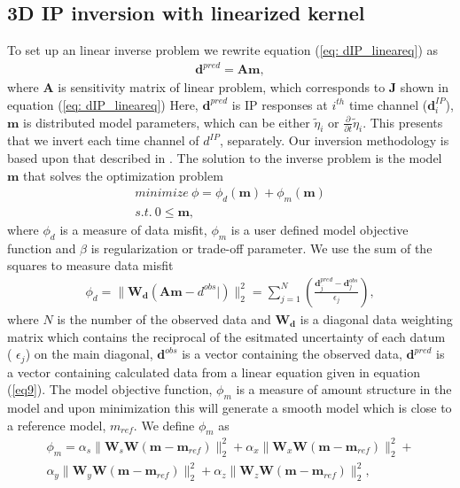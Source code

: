 \documentclass[a4paper, 11pt]{article}
\newcommand{\peta}{\tilde{\eta}}
\begin{document}
\subsection{3D IP inversion with linearized kernel}
To set up an linear inverse problem we rewrite equation (\ref{eq: dIP_lineareq}) as
\begin{eqnarray}
  \mathbf{d}^{pred} = \mathbf{A}\mathbf{m},
  \label{eq9}
\end{eqnarray}
where $\mathbf{A}$ is sensitivity matrix of linear problem, which corresponds to $\mathbf{J}$ shown in equation (\ref{eq: dIP_lineareq}) 
Here, $\mathbf{d}^{pred}$ is IP responses at $i^{th}$ time channel ($\mathbf{d}^{IP}_i$), $\mathbf{m}$ is distributed model parameters, which can be either $\peta_{i}$ or $\frac{\partial}{\partial t}\peta_{i}$. 
This presents that we invert each time channel of $d^{IP}$, separately. 
Our inversion methodology is based upon that described in \cite{doug1994}. The solution to the inverse problem is the model $\mathbf{m}$ that solves the optimization problem
\begin{eqnarray}
  minimize \ \phi =  \phi_d(\mathbf{m}) + \phi_m(\mathbf{m})\nonumber \\
  s.t. \ 0 \le \mathbf{m},
  \label{eq10}
\end{eqnarray}
where $\phi_d$ is a measure of data misfit, $\phi_m$ is a user defined model objective function and $\beta$ is regularization or trade-off parameter. 
We use the sum of the squares to measure data misfit
\begin{eqnarray}
  \phi_d = \| \mathbf{W_d}(\mathbf{A}\mathbf{m}-d^{obs}|)\|^2_2 =
  \sum^N_{j=1}(\frac{\mathbf{d}^{pred}_j-\mathbf{d}^{obs}_j}{\epsilon_j}),
  \label{eq11}
\end{eqnarray}
where $N$ is the number of the observed data and $\mathbf{W_d}$ is a diagonal data weighting matrix which contains the reciprocal of the esitmated uncertainty of each datum (
$\epsilon_j$) on the main diagonal,  $\mathbf{d}^{obs}$ is a vector containing the observed data, $\mathbf{d}^{pred}$ is a vector containing calculated data from a linear equation given in equation (\ref{eq9}).
The model objective function, $\phi_m$ is a measure of amount structure in the model and upon minimization this will generate a smooth model which is close to a reference model, $m_{ref}$. 
We define $\phi_m$ as
\begin{eqnarray}
  \phi_m = \alpha_s\| \mathbf{W}_s\mathbf{W}(\mathbf{m}-\mathbf{m}_{ref})\|^2_2+
       \alpha_x\| \mathbf{W}_x\mathbf{W}(\mathbf{m}-\mathbf{m}_{ref})\|^2_2+ \nonumber \\
       \alpha_y\| \mathbf{W}_y\mathbf{W}(\mathbf{m}-\mathbf{m}_{ref})\|^2_2+
       \alpha_z\| \mathbf{W}_z\mathbf{W}(\mathbf{m}-\mathbf{m}_{ref})\|^2_2,
  \label{eq12}
\end{eqnarray}
\end{document}
